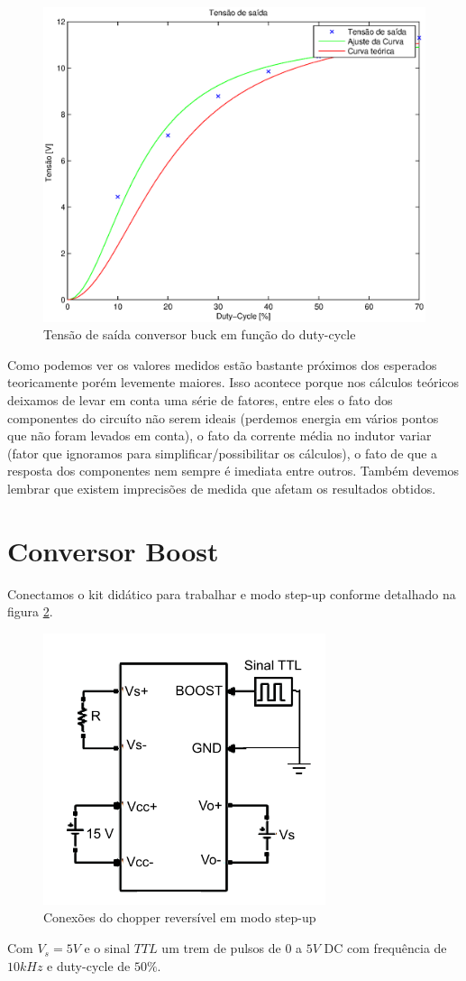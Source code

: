\documentclass{article}
\begin{document}
\begin{figure}[H]
	\centering
	\includegraphics[width=0.7\linewidth]{Dados/buck/tvd}
	\caption{Tensão de saída conversor buck em função do duty-cycle}
	\label{fig:butvd}
\end{figure}

Como podemos ver os valores medidos estão bastante próximos dos esperados teoricamente porém levemente maiores. Isso acontece porque nos cálculos teóricos deixamos de levar em conta uma série de fatores, entre eles o fato dos componentes do circuíto não serem ideais (perdemos energia em vários pontos que não foram levados em conta), o fato da corrente média no indutor variar (fator que ignoramos para simplificar/possibilitar os cálculos), o fato de que a resposta dos componentes nem sempre é imediata entre outros. Também devemos lembrar que existem imprecisões de medida que afetam os resultados obtidos.


\section{Conversor Boost}

Conectamos o kit didático para trabalhar e modo step-up conforme detalhado na figura \ref{fig:boesq}.
\begin{figure}[H]
	\centering
	\includegraphics[width=0.5\linewidth]{Dados/boost/esq}
	\caption{Conexões do chopper reversível em modo step-up \cite{bb:paiva}}
	\label{fig:boesq}
\end{figure}
Com $V_s = 5V$ e o sinal $TTL$ um trem de pulsos de $0$ a $5V$ DC com frequência de $10kHz$ e duty-cycle de $50\%$.
\end{document}
